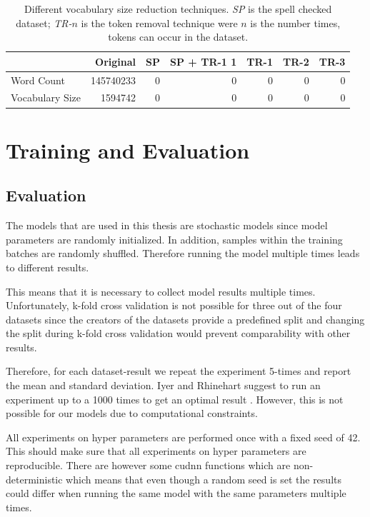 \begin{table}[]
	\centering
	\begin{tabular}{lrrrrrr}
			\toprule
			& Original  & SP & SP + TR-1 1 & TR-1 & TR-2 & TR-3 \\
			\midrule
			Word Count      & 145740233 & 0              & 0                                & 0               & 0               & 0               \\
			Vocabulary Size & 1594742   & 0              & 0                                & 0               & 0               & 0            \\  
			\bottomrule 	
	\end{tabular}

	\caption{Different vocabulary size reduction techniques. \textit{SP} is the spell checked dataset; \textit{TR-}$n$ is the token removal technique were $n$ is the number times, tokens can occur in the dataset.}
	\label{tab:05_amazonVocabSize}
\end{table}

\section{Training and Evaluation}
\label{sec:05_TrainingAndEvaluation}

\subsection{Evaluation}

The models that are used in this thesis are stochastic models since model parameters are randomly initialized. In addition, samples within the training batches are randomly shuffled. Therefore running the model multiple times leads to different results.

This means that it is necessary to collect model results multiple times. Unfortunately, k-fold cross validation is not possible for three out of the four datasets since the creators of the datasets provide a predefined split and changing the split during k-fold cross validation would prevent comparability with other results.

Therefore, for each dataset-result we repeat the experiment 5-times and report the mean and standard deviation. Iyer and Rhinehart suggest to run an experiment up to a 1000 times to get an optimal result \cite{Iyer1999}. However, this is not possible for our models due to computational constraints.

All experiments on hyper parameters are performed once with a fixed seed of 42. This should make sure that all experiments on hyper parameters are reproducible. There are however some cudnn functions which are non-deterministic which means that even though a random seed is set the results could differ when running the same model with the same parameters multiple times.


